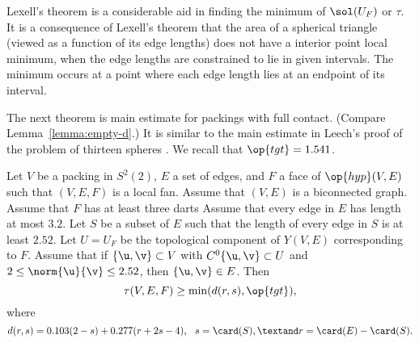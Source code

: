 \begin{remark}
Lexell's theorem is a considerable aid in finding the minimum of
  $\sol(U_F)$ or $\tau$.
  It is a consequence of Lexell's theorem that the area of a spherical
  triangle (viewed as a function of its edge lengths) does not have a
  interior point local minimum, when the edge lengths are
  constrained to lie in given intervals.  The minimum occurs at a
  point where each edge length lies at an endpoint of its interval.
\end{remark}

The next theorem is main estimate for packings with full contact.
(Compare Lemma~\ref{lemma:empty-d}.)  It is similar to the main
estimate in Leech's proof of the problem of thirteen spheres
\cite{Leech:1956:MG}.  We recall that $\op{tgt}=1.541$.
%
%


\begin{theorem}\label{lemma:main-estimate-12}
  Let $V$ be a packing in $S^2(2)$, $E$ a set of edges, and $F$ a face
  of $\op{hyp}(V,E)$ such that $(V,E,F)$ is a local fan.  Assume that
  $(V,E)$ is a biconnected graph.  Assume that $F$ has at least three
  darts Assume that every edge in $E$ has length at most $3.2$.  Let
  $S$ be a subset of $E$ such that the length of every edge in $S$ is
  at least $2.52$.  Let $U=U_F$ be the topological component of
  $Y(V,E)$ corresponding to $F$.  Assume that if $\{\u,\v\}\subset V$
  with $C^0\{\u,\v\}\subset U$ and $2\le\norm{\u}{\v} \le 2.52$, then
  $\{\u,\v\}\in E$.  Then
\[\tau(V,E,F) \ge \min(d(r,s),\op{tgt}),\]
where
\[
d(r,s) = 0.103 (2-s) + 0.277 (r+2s-4),\ \ 
s = \card(S),\textand  r = \card(E)-\card(S).
\]
\end{theorem}


